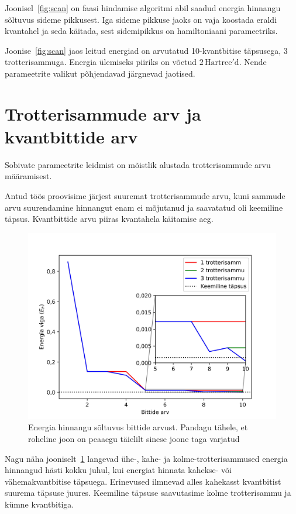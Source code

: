 \documentclass[12pt]{report}
\begin{document}
Joonisel~\ref{fig:scan} on faasi hindamise algoritmi abil saadud energia hinnangu sõltuvus sideme pikkusest.
Iga sideme pikkuse jaoks on vaja koostada eraldi kvantahel ja seda käitada, sest sidemipikkus on hamiltoniaani parameetriks.

Joonise~\ref{fig:scan} jaos leitud energiad on arvutatud 10-kvantbitise täpsusega, 3 trotterisammuga.
Energia ülemiseks piiriks on võetud \(2\,\mathrm{Hartree'd}\).
Nende parameetrite valikut põhjendavad järgnevad jaotised.


\section{Trotterisammude arv ja kvantbittide arv}

Sobivate parameetrite leidmist on mõistlik alustada trotterisammude arvu määramisest.

Antud töös proovisime järjest suuremat trotterisammude arvu, kuni sammude arvu suurendamine hinnangut enam ei mõjutanud ja saavatatud oli keemiline täpsus.
Kvantbittide arvu piiras kvantahela käitamise aeg.

\begin{figure}[h]
    \centering
    \includegraphics{trotsteps.jpg}
    \caption{Energia hinnangu sõltuvus bittide arvust. Pandagu tähele, et roheline joon on peaaegu täielilt sinese joone taga varjatud}
    \label{fig:trotsteps}
\end{figure}

Nagu näha jooniselt~\ref{fig:trotsteps} langevad ühe-, kahe- ja kolme-trotterisammused energia hinnangud hästi kokku juhul, kui energiat hinnata kahekse- või vähemakvantbitise täpsuega.
Erinevused ilmnevad alles kahekasst kvantbitist suurema täpsuse juures.
Keemiline täpsuse saavutasime kolme trotterisammu ja kümne kvantbitiga.
\end{document}
